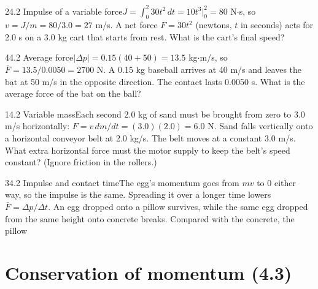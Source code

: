 \documentclass[11pt]{article}
\begin{document}
\begin{q}{2}{4.2 Impulse of a variable force}{$J = \int_0^2 30t^2\,dt = 10t^3\big|_0^2 = 80$ N$\cdot$s, so $v = J/m = 80/3.0 = 27$ m/s.}
A net force $F = 30t^2$ (newtons, $t$ in seconds) acts for 2.0 s on a 3.0 kg cart that starts from rest. What is the cart's final speed?
\end{q}
\begin{q}{4}{4.2 Average force}{$|\Delta p| = 0.15(40 + 50) = 13.5$ kg$\cdot$m/s, so $\bar F = 13.5/0.0050 = 2700$ N.}
A 0.15 kg baseball arrives at 40 m/s and leaves the bat at 50 m/s in the opposite direction. The contact lasts 0.0050 s. What is the average force of the bat on the ball?
\end{q}
\begin{q}{1}{4.2 Variable mass}{Each second 2.0 kg of sand must be brought from zero to 3.0 m/s horizontally: $F = v\,dm/dt = (3.0)(2.0) = 6.0$ N.}
Sand falls vertically onto a horizontal conveyor belt at 2.0 kg/s. The belt moves at a constant 3.0 m/s. What extra horizontal force must the motor supply to keep the belt's speed constant? (Ignore friction in the rollers.)
\end{q}
\begin{q}{3}{4.2 Impulse and contact time}{The egg's momentum goes from $mv$ to 0 either way, so the impulse is the same. Spreading it over a longer time lowers $\bar F = \Delta p/\Delta t$.}
An egg dropped onto a pillow survives, while the same egg dropped from the same height onto concrete breaks. Compared with the concrete, the pillow
\end{q}

\section{Conservation of momentum (4.3)}
\end{document}

